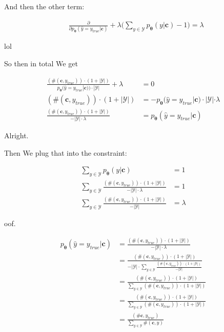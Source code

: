 \documentclass{article}
\newcommand{\vtheta}{\boldsymbol{\theta}}
\newcommand{\model}{p_{\vtheta}}
\newcommand{\context}{\boldsymbol{c}}
\begin{document}
		And then the other term:
		
		\begin{align}
			&\frac{\partial}{\partial \model(\hat{y} = y_{true}|\context)} + \lambda\bigg(\sum_{y\in\mathcal{Y}}\model(y|\context) - 1 \bigg) = \lambda
		\end{align}
		
		lol
		
		So then in total We get
		
		\begin{align}
			\frac{(\#(\context, y_{true}))\cdot (1 + |\mathcal{Y}|)}{\model(\hat{y} = y_{true}|\context)) \cdot |\mathcal{Y}|} + \lambda &= 0\\
			(\#(\context, y_{true}))\cdot (1 + |\mathcal{Y}|) &= - \model(\hat{y} = y_{true}|\context) \cdot |\mathcal{Y}|\cdot \lambda \\
			\frac{(\#(\context, y_{true}))\cdot (1 + |\mathcal{Y}|)}{- |\mathcal{Y}|\cdot \lambda 	} &=  \model(\hat{y} = y_{true}|\context) 
		\end{align}
		
		Alright.
		
		Then We plug that into the constraint:
		
		\begin{align}
			\sum_{y\in\mathcal{Y}} \model(y|\context) &= 1\\
			\sum_{y\in\mathcal{Y}} \frac{(\#(\context, y_{true}))\cdot (1 + |\mathcal{Y}|)}{- |\mathcal{Y}|\cdot \lambda } &= 1\\
			\sum_{y\in\mathcal{Y}} \frac{(\#(\context, y_{true}))\cdot (1 + |\mathcal{Y}|)}{- |\mathcal{Y}| } &= \lambda
		\end{align}
		
		oof.
		
		\begin{align}
			\model(\hat{y} = y_{true}|\context) &= \frac{(\#(\context, y_{true}))\cdot (1 + |\mathcal{Y}|)}{- |\mathcal{Y}|\cdot \lambda}\\
			&= \frac{(\#(\context, y_{true}))\cdot (1 + |\mathcal{Y}|)}{- |\mathcal{Y}|\cdot \sum_{y\in\mathcal{Y}} \frac{(\#(\context, y_{true}))\cdot (1 + |\mathcal{Y}|)}{- |\mathcal{Y}| }}\\
			&= \frac{(\#(\context, y_{true}))\cdot (1 + |\mathcal{Y}|)}{\sum_{y\in\mathcal{Y}} (\#(\context, y_{true}))\cdot (1 + |\mathcal{Y}|)}\\
			&= \frac{(\#(\context, y_{true}))\cdot (1 + |\mathcal{Y}|)}{\sum_{y\in\mathcal{Y}} (\#(\context, y_{true}))\cdot (1 + |\mathcal{Y}|)}\\
			&= \frac{(\#\context, y_{true})}{\sum_{y\in\mathcal{Y}} \#(\context, y)}\\
		\end{align}
		
\end{document}
